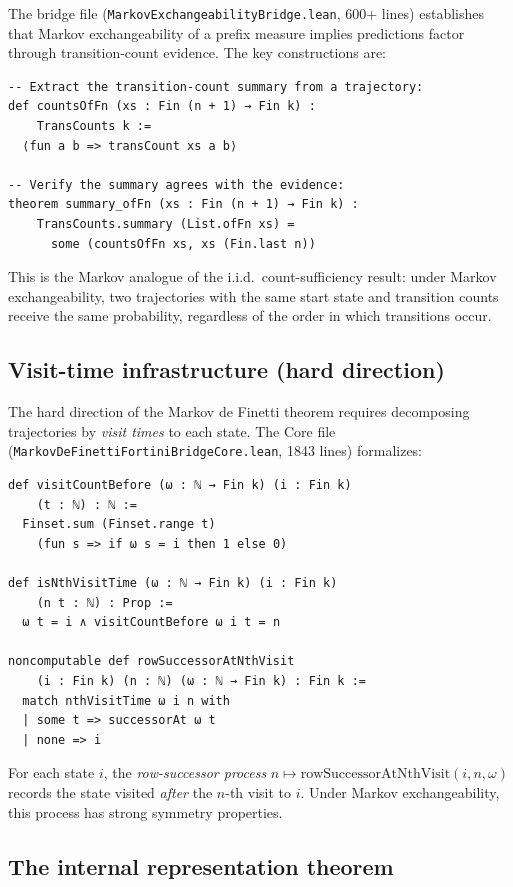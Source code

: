 \documentclass[11pt]{article}
\theoremstyle{definition}
\newcommand{\lean}[1]{\texttt{#1}}
\begin{document}
The bridge file (\lean{MarkovExchangeabilityBridge.lean}, 600+ lines)
establishes that Markov exchangeability of a prefix measure implies
predictions factor through transition-count evidence.  The key
constructions are:

\begin{lstlisting}
-- Extract the transition-count summary from a trajectory:
def countsOfFn (xs : Fin (n + 1) → Fin k) :
    TransCounts k :=
  ⟨fun a b => transCount xs a b⟩

-- Verify the summary agrees with the evidence:
theorem summary_ofFn (xs : Fin (n + 1) → Fin k) :
    TransCounts.summary (List.ofFn xs) =
      some (countsOfFn xs, xs (Fin.last n))
\end{lstlisting}

This is the Markov analogue of the i.i.d.\ count-sufficiency result:
under Markov exchangeability, two trajectories with the same start state
and transition counts receive the same probability, regardless of
the order in which transitions occur.

\subsection{Visit-time infrastructure (hard direction)}

The hard direction of the Markov de Finetti theorem requires decomposing
trajectories by \emph{visit times} to each state.  The Core file
(\lean{MarkovDeFinettiFortiniBridgeCore.lean}, 1843 lines) formalizes:

\begin{lstlisting}
def visitCountBefore (ω : ℕ → Fin k) (i : Fin k)
    (t : ℕ) : ℕ :=
  Finset.sum (Finset.range t)
    (fun s => if ω s = i then 1 else 0)

def isNthVisitTime (ω : ℕ → Fin k) (i : Fin k)
    (n t : ℕ) : Prop :=
  ω t = i ∧ visitCountBefore ω i t = n

noncomputable def rowSuccessorAtNthVisit
    (i : Fin k) (n : ℕ) (ω : ℕ → Fin k) : Fin k :=
  match nthVisitTime ω i n with
  | some t => successorAt ω t
  | none => i
\end{lstlisting}

For each state $i$, the \emph{row-successor process}
$n \mapsto \mathrm{rowSuccessorAtNthVisit}(i, n, \omega)$
records the state visited \emph{after} the $n$-th visit to $i$.
Under Markov exchangeability, this process has strong symmetry properties.

\subsection{The internal representation theorem}
\label{sec:internal}
\end{document}
